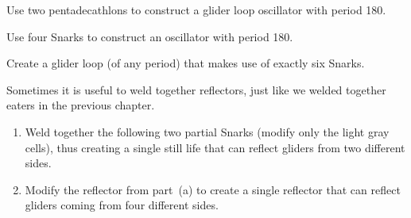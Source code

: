\begin{multicols}{2}
\begin{problemstar}
		\begin{center}
		\end{center}
		
	\end{problemstar}
	
	
	\mfilbreak
	
	
	\begin{problem}\label{exer:pentadecathlon_relay_180} 
		Use two pentadecathlons to construct a glider loop oscillator with period 180.
	\end{problem}
	
	
	\mfilbreak
	
	
	\begin{problem}\label{exer:snark_relay_180} 
		Use four Snarks to construct an oscillator with period 180.
	\end{problem}
	
	
	\mfilbreak
	
	
	\begin{problemstar}\label{exer:six_snark_relay} 
		Create a glider loop (of any period) that makes use of exactly six Snarks.
	\end{problemstar}
	
	
	\mfilbreak
	
	
	\begin{problemstar}\label{exer:snark_weld} 
		Sometimes it is useful to weld together reflectors, just like we welded together eaters in the previous chapter.\smallskip
		
		\begin{enumerate}[label=\bf\color{ocre}(\alph*)]
			\item Weld together the following two partial Snarks (modify only the light gray cells), thus creating a single still life that can reflect gliders from two different sides.
			\begin{center}
			\end{center}
			
			\item Modify the reflector from part~(a) to create a single reflector that can reflect gliders coming from four different sides.
		\end{enumerate}
	\end{problemstar}
	

\end{multicols}
